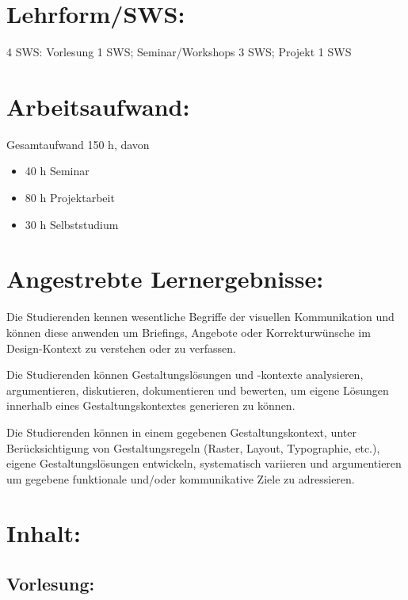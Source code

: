 \section*{Lehrform/SWS:}\label{lehrformsws-21}

4 SWS: Vorlesung 1 SWS; Seminar/Workshops 3 SWS; Projekt 1 SWS

\section*{Arbeitsaufwand:}\label{arbeitsaufwand-20}

Gesamtaufwand 150 h, davon

\begin{itemize}
\tightlist
\item
  40 h Seminar
\item
  80 h Projektarbeit
\item
  30 h Selbststudium
\end{itemize}

\section*{Angestrebte
Lernergebnisse:}\label{angestrebte-lernergebnisse-21}

Die Studierenden kennen wesentliche Begriffe der visuellen Kommunikation
und können diese anwenden um Briefings, Angebote oder Korrekturwünsche
im Design-Kontext zu verstehen oder zu verfassen.

Die Studierenden können Gestaltungslösungen und -kontexte analysieren,
argumentieren, diskutieren, dokumentieren und bewerten, um eigene
Lösungen innerhalb eines Gestaltungskontextes generieren zu können.

Die Studierenden können in einem gegebenen Gestaltungskontext, unter
Berücksichtigung von Gestaltungsregeln (Raster, Layout, Typographie,
etc.), eigene Gestaltungslösungen entwickeln, systematisch variieren und
argumentieren um gegebene funktionale und/oder kommunikative Ziele zu
adressieren.

\section*{Inhalt:}\label{inhalt-21}

\subsection*{Vorlesung:}\label{vorlesung}

